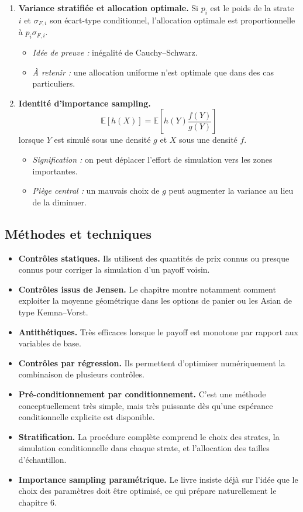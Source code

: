 \documentclass[11pt,a4paper]{article}
\newcommand{\E}{\mathbb{E}}
\begin{document}
\begin{enumerate}[label=\textbf{\arabic*.}]
  \item \textbf{Variance stratifiée et allocation optimale.} Si $p_i$ est le poids de la strate $i$ et $\sigma_{F,i}$ son écart-type conditionnel, l'allocation optimale est proportionnelle à $p_i\sigma_{F,i}$.
  \begin{itemize}
    \item \emph{Idée de preuve :} inégalité de Cauchy--Schwarz.
    \item \emph{À retenir :} une allocation uniforme n'est optimale que dans des cas particuliers.
  \end{itemize}

  \item \textbf{Identité d'importance sampling.}
  \[
    \E[h(X)] = \E\!\left[h(Y)\frac{f(Y)}{g(Y)}\right]
  \]
  lorsque $Y$ est simulé sous une densité $g$ et $X$ sous une densité $f$.
  \begin{itemize}
    \item \emph{Signification :} on peut déplacer l'effort de simulation vers les zones importantes.
    \item \emph{Piège central :} un mauvais choix de $g$ peut augmenter la variance au lieu de la diminuer.
  \end{itemize}
\end{enumerate}

\subsection{Méthodes et techniques}

\begin{itemize}
  \item \textbf{Contrôles statiques.} Ils utilisent des quantités de prix connus ou presque connus pour corriger la simulation d'un payoff voisin.
  \item \textbf{Contrôles issus de Jensen.} Le chapitre montre notamment comment exploiter la moyenne géométrique dans les options de panier ou les Asian de type Kemna--Vorst.
  \item \textbf{Antithétiques.} Très efficaces lorsque le payoff est monotone par rapport aux variables de base.
  \item \textbf{Contrôles par régression.} Ils permettent d'optimiser numériquement la combinaison de plusieurs contrôles.
  \item \textbf{Pré-conditionnement par conditionnement.} C'est une méthode conceptuellement très simple, mais très puissante dès qu'une espérance conditionnelle explicite est disponible.
  \item \textbf{Stratification.} La procédure complète comprend le choix des strates, la simulation conditionnelle dans chaque strate, et l'allocation des tailles d'échantillon.
  \item \textbf{Importance sampling paramétrique.} Le livre insiste déjà sur l'idée que le choix des paramètres doit être optimisé, ce qui prépare naturellement le chapitre 6.
\end{itemize}
\end{document}
